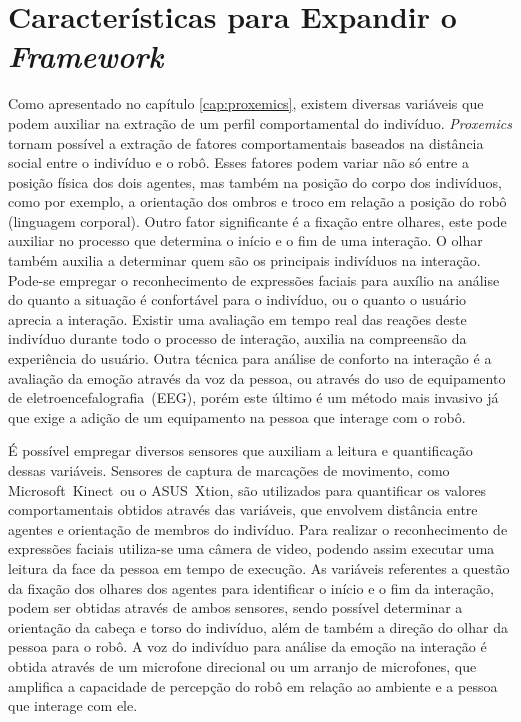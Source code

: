 \section{Características para Expandir o \emph{Framework}}
\label{sec:extracaocaracteristicas}

Como apresentado no capítulo \ref{cap:proxemics}, existem diversas variáveis que podem auxiliar na extração de um perfil comportamental do indivíduo. \emph{Proxemics} tornam possível a extração de fatores comportamentais baseados na distância social entre o indivíduo e o robô. Esses fatores podem variar não só entre a posição física dos dois agentes, mas também na posição do corpo dos indivíduos, como por exemplo, a orientação dos ombros e troco em relação a posição do robô (linguagem corporal). Outro fator significante é a fixação entre olhares, este pode auxiliar no processo que determina o início e o fim de uma interação. O olhar também auxilia a determinar quem são os principais indivíduos na interação. Pode-se empregar o reconhecimento de expressões faciais para auxílio na análise do quanto a situação é confortável para o indivíduo, ou o quanto o usuário aprecia a interação. Existir uma avaliação em tempo real das reações deste indivíduo durante todo o processo de interação, auxilia na compreensão da experiência do usuário. Outra técnica para análise de conforto na interação é a avaliação da emoção através da voz da pessoa, ou através do uso de equipamento de eletroencefalografia~(EEG), porém este último é um método mais invasivo já que exige a adição de um equipamento na pessoa que interage com o robô.

É possível empregar diversos sensores que auxiliam a leitura e quantificação dessas variáveis. Sensores de captura de marcações de movimento, como Microsoft\textregistered\ Kinect\textregistered\ ou o ASUS\textregistered\ Xtion\textregistered, são utilizados para quantificar os valores comportamentais obtidos através das variáveis, que envolvem distância entre agentes e orientação de membros do indivíduo. Para realizar o reconhecimento de expressões faciais utiliza-se uma câmera de video, podendo assim executar uma leitura da face da pessoa em tempo de execução. As variáveis referentes a questão da fixação dos olhares dos agentes para identificar o início e o fim da interação, podem ser obtidas através de ambos sensores, sendo possível determinar a orientação da cabeça e torso do indivíduo, além de também a direção do olhar da pessoa para o robô. A voz do indivíduo para análise da emoção na interação é obtida através de um microfone direcional ou um arranjo de microfones, que amplifica a capacidade de percepção do robô em relação ao ambiente e a pessoa que interage com ele.

